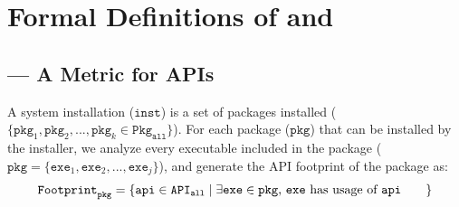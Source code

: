 \chapter{Formal Definitions of \UsageMetric{} and \CompatMetric{}}
\label{chap:defs}


\section{\UsageMetric{} --- A Metric for APIs}
\label{sec:defs:usagemetric}

\vspace{0.1in}
{\noindent
{}}
\vspace{0.1in}

A system installation ($\mathtt{inst}$)
is a set of packages installed ($\{\mathtt{pkg}_1, \mathtt{pkg}_2, ..., \mathtt{pkg}_k \in \mathtt{Pkg}_\mathtt{all}\}$).
For each package ($\mathtt{pkg}$)  that can be installed by the installer,
we analyze every executable included in the package 
($\mathtt{pkg} = \{\mathtt{exe}_1, \mathtt{exe}_2, ..., \mathtt{exe}_j\}$), and
generate the API footprint of the package as:
\begin{align*}
{\mathtt{Footprint}}_{\mathtt{pkg}} = \{\mathtt{api} \in {\mathtt{API}}_{\mathtt{all}} \mid \text{\parbox{2.3in}{$\exists \mathtt{exe} \in \mathtt{pkg}$,
$\mathtt{exe}$ has usage of $\mathtt{api}$}}\}
\end{align*}

